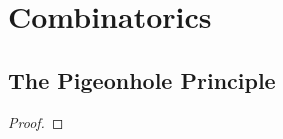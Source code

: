 

\chapter{Combinatorics}
    \section{The Pigeonhole Principle}
        \begin{theorem}
        \end{theorem}
        \begin{proof}
        \end{proof}
